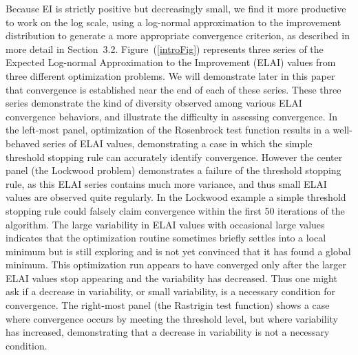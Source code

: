 \documentclass[12pt]{article}
\begin{document}
Because EI is strictly positive but decreasingly small,
we find it more productive to work on the log scale, using a log-normal
approximation to the improvement distribution to generate a more appropriate convergence criterion, as described in more
detail in Section~3.2.
%
Figure~(\ref{introFig}) represents three series of the Expected
Log-normal Approximation to the Improvement (ELAI) values from three
different optimization problems.
%
We will demonstrate later in this paper that convergence is established near the end of each of these series.
These three series demonstrate the kind of diversity observed among various ELAI convergence behaviors, and illustrate the difficulty in assessing convergence.
%
In the left-most panel, optimization of the Rosenbrock test function 
results in a well-behaved series of ELAI values, demonstrating a case in 
which the simple threshold stopping rule can accurately identify convergence.
However the center panel (the Lockwood problem) demonstrates a failure of 
the threshold stopping rule, as this ELAI series contains much more 
variance, and thus small ELAI values are observed quite regularly.
In the Lockwood example a simple threshold stopping rule could falsely
claim convergence within the first 50 iterations of the algorithm.
%
The large variability in ELAI values with occasional large values indicates that 
the optimization routine sometimes briefly settles into a local minimum but is 
still exploring and is not yet convinced that it has found a global minimum.
This optimization run appears to have converged only after the
larger ELAI values stop appearing and the variability has decreased.
%
Thus one might ask if a decrease in variability, or small variability,
is a necessary condition for convergence.  
%
The right-most panel (the Rastrigin test function) 
shows a case where convergence occurs by meeting the threshold level,
but where variability has increased, demonstrating that a decrease in
variability is not a necessary condition.

%
%
\end{document}
